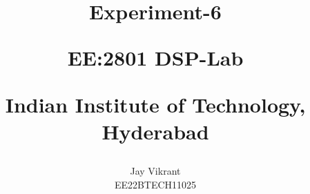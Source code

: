 \documentclass[journal,12pt,onecolumn]{IEEEtran}
\theoremstyle{remark}
\begin{document}
%




\vspace{3cm}

\title{
Experiment-6

\large{EE:2801 DSP-Lab}

Indian Institute of Technology, Hyderabad
}
\author{Jay Vikrant

EE22BTECH11025
}	


%
%
%

% 
%



% 
\end{document}
